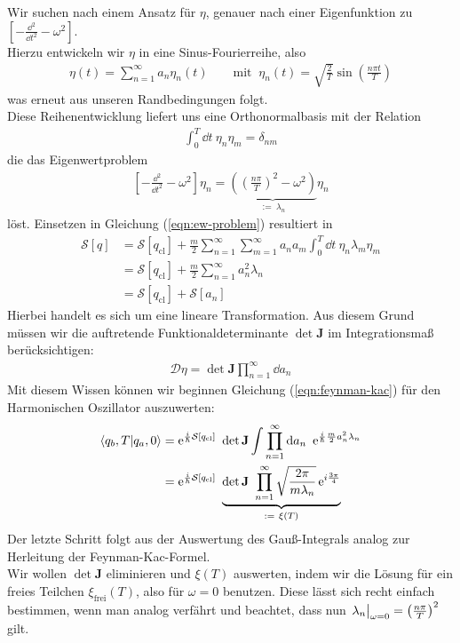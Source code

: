 	Wir suchen nach einem Ansatz für $\eta$, genauer nach einer Eigenfunktion zu $\left[-\frac{\dd^2}{\dd t^2}-\omega^2\right]$. \\
	Hierzu entwickeln wir $\eta$ in eine Sinus-Fourierreihe, also
	\begin{align}
		\eta(t) = \sum_{n=1}^{\infty} a_n\eta_n(t) \qquad \text{mit } \ \eta_n(t) = \sqrt{\frac{2}{T}}\sin\left(\frac{n\pi t}{T}\right)
	\end{align}
was erneut aus unseren Randbedingungen folgt. \\ 
Diese Reihenentwicklung liefert uns eine Orthonormalbasis mit der Relation 
\begin{align}
	\int_0^T \dd t \ \eta_n \eta_m = \delta_{nm}
\end{align}
die das Eigenwertproblem
\begin{align}
	\left[-\frac{\dd^2}{\dd t^2}-\omega^2\right]\eta_n = \underbrace{\left(\left(\frac{n\pi}{T}\right)^2-\omega^2\right)}_{:= \ \lambda_n}\eta_n 
\end{align}
löst. Einsetzen in Gleichung (\ref{eqn:ew-problem}) resultiert in 
\begin{align}
\mathcal{S}[q] &= \mathcal{S}[q_{\text{cl}}] + \frac{m}{2}\sum_{n=1}^{\infty}\sum_{m=1}^{\infty}a_na_m \int_0^T \dd t \ \eta_n\lambda_m\eta_m \nonumber \\
&= \mathcal{S}[q_{\text{cl}}] + \frac{m}{2}\sum_{n=1}^{\infty}a_n^2\lambda_n \nonumber \\
&= \mathcal{S}[q_{\text{cl}}] + \mathcal{S}[a_n]
\end{align}
 Hierbei handelt es sich um eine lineare Transformation. Aus diesem Grund müssen wir die auftretende Funktionaldeterminante $\operatorname{det}\mathbf{J}$ im Integrationsmaß berücksichtigen:
 \begin{align*}
 	\mathcal{D}\eta = \operatorname{det}\mathbf{J} \prod_{n=1}^{\infty} \dd a_n
 \end{align*}
 Mit diesem Wissen können wir beginnen Gleichung (\ref{eqn:feynman-kac}) für den Harmonischen Oszillator auszuwerten:
 \begin{align}
 	\braket{q_b,T}{q_a,0} &= \operatorname{e}^{\ihbar\mathcal{S}[q_{\text{cl}}]} \ \operatorname{det}\mathbf{J} \int \prod_{n=1}^{\infty} \dd a_n \  \operatorname{e}^{\ihbar\frac{m}{2} a_n^2 \lambda_n} \nonumber\\
 	&= \operatorname{e}^{\ihbar\mathcal{S}[q_{\text{cl}}]} \ \underbrace{\operatorname{det}\mathbf{J} \  \prod_{n=1}^{\infty} \sqrt{\frac{2\pi}{m\lambda_n}} \operatorname{e}^{i\frac{3\pi}{4}}}_{:= \ \xi(T)}
 \end{align}
 Der letzte Schritt folgt aus der Auswertung des Gauß-Integrals analog zur Herleitung der Feynman-Kac-Formel. \\
 Wir wollen $\operatorname{det}\mathbf{J}$ eliminieren und $\xi(T)$ auswerten, indem wir die Lösung für ein freies Teilchen $\xi_{\text{frei}}(T)$, also für $\omega = 0$ benutzen. Diese lässt sich recht einfach bestimmen, wenn man analog verfährt und beachtet, dass nun $\eval{\lambda_n}_{\omega = 0} = \left(\frac{n\pi}{T}\right)^2$ gilt. \\
 
